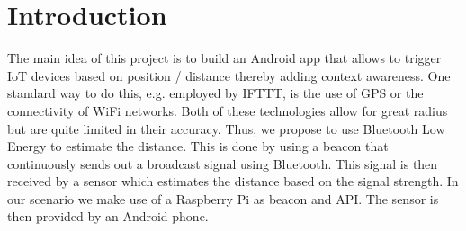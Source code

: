 \documentclass[
10pt, %
a4paper, %
oneside, %
headinclude,footinclude, %
BCOR5mm, %
]{scrartcl}
\begin{document}




\section{Introduction}
The main idea of this project is to build an Android app that allows to trigger IoT devices based on position / distance thereby adding context awareness. One standard way to do this, e.g. employed by IFTTT, is the use of GPS or the connectivity of WiFi networks. Both of these technologies allow for great radius but are quite limited in their accuracy. Thus, we propose to use Bluetooth Low Energy to estimate the distance. This is done by using a beacon that continuously sends out a broadcast signal using Bluetooth. This signal is then received by a sensor which estimates the distance based on the signal strength. In our scenario we make use of a Raspberry Pi as beacon and API. The sensor is then provided by an Android phone.
\end{document}
